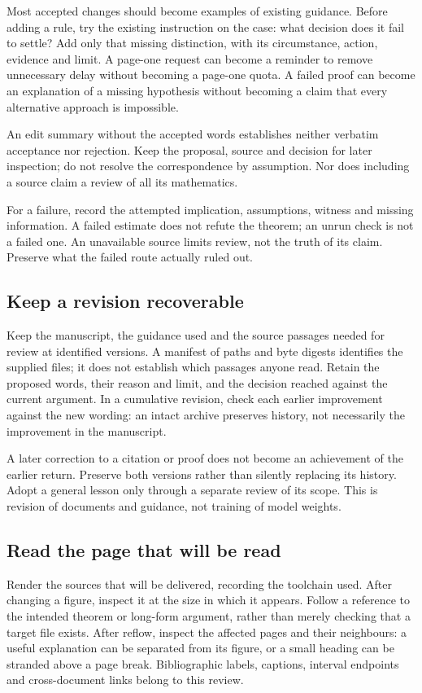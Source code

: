 Most accepted changes should become examples of existing guidance. Before
adding a rule, try the existing instruction on the case: what decision does
it fail to settle? Add only that missing distinction, with its circumstance,
action, evidence and limit. A page-one request
can become a reminder to remove unnecessary delay without becoming a page-one
quota. A failed proof can become an explanation of a missing hypothesis without
becoming a claim that every alternative approach is impossible.

An edit summary without the accepted words establishes neither verbatim
acceptance nor rejection. Keep the proposal, source and decision for later
inspection; do not resolve the correspondence by assumption. Nor does including
a source claim a review of all its mathematics.

For a failure, record the attempted implication, assumptions, witness and
missing information. A failed estimate does not refute the theorem; an unrun
check is not a failed one. An unavailable source limits review, not the truth
of its claim. Preserve what the failed route actually ruled out.

\subsection{Keep a revision recoverable}

Keep the manuscript, the guidance used and the source passages needed for
review at identified versions. A manifest of paths and byte digests identifies
the supplied files; it does not establish which passages anyone read. Retain
the proposed words, their reason and limit, and the decision reached against
the current argument. In a cumulative revision, check each earlier improvement
against the new wording: an intact archive preserves history, not necessarily
the improvement in the manuscript.

A later correction to a citation or proof does not become an achievement of
the earlier return. Preserve both versions rather than silently replacing
its history. Adopt a general lesson only through a separate review of its
scope. This is revision of documents and guidance, not training of model
weights.

\subsection{Read the page that will be read}

Render the sources that will be delivered, recording the toolchain used.
After changing a figure, inspect it at the size in which it appears. Follow a
reference to the intended theorem or long-form argument, rather than merely
checking that a target file exists. After reflow, inspect the affected pages
and their neighbours: a useful explanation can be separated from its figure,
or a small heading can be stranded above a page break. Bibliographic labels,
captions, interval endpoints and cross-document links belong to this review.

